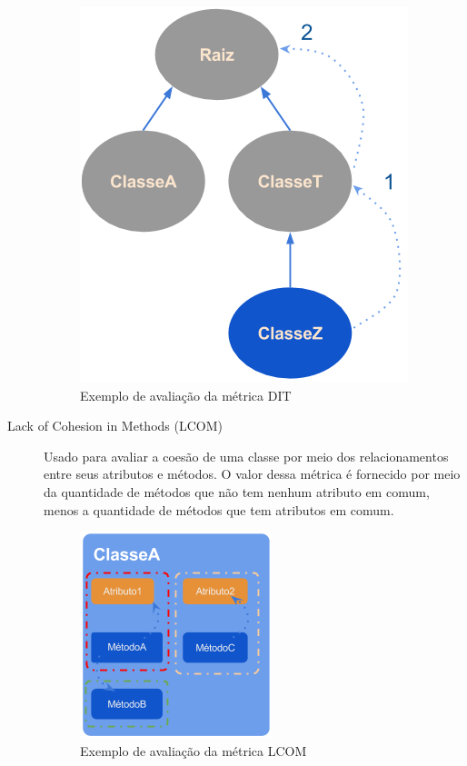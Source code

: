 \documentclass[conference]{IEEEtran}
\begin{document}
\begin{description}
\begin{figure}[htb]
	\caption{\label{fig:pic_dit}Exemplo de avaliação da métrica DIT}
	\begin{center}
		\includegraphics[scale=0.6]{img/pic_dit.png}
	\end{center}
	
\end{figure}


\item[Lack of Cohesion in Methods (LCOM)] Usado para avaliar a coesão de uma
classe por meio dos relacionamentos entre seus atributos e métodos.
O valor dessa métrica é fornecido por meio da quantidade de métodos que não tem
nenhum atributo em comum, menos a quantidade de métodos que tem atributos em
comum.

\begin{figure}[htb]
	\begin{center}
		\includegraphics[scale=0.8]{img/pic_lcom_ex1.png}
	\end{center}
	\caption{\label{fig:pic_lcom_ex1}Exemplo  de avaliação da métrica LCOM}
	

\end{figure}
\end{description}
\end{document}
